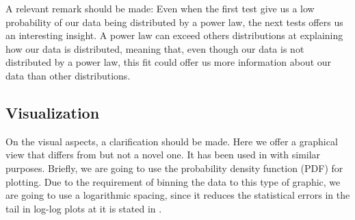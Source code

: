 \documentclass{article}
\begin{document}
A relevant remark should be made: Even when the first test give us a
low probability of our data being distributed by a power law, the next
tests offers us an interesting insight. A power law can exceed others
distributions at explaining how our data is distributed, meaning that,
even though our data is not distributed by a power law, this fit could
offer us more information about our data than other distributions.

\subsection{Visualization}
 
On the visual aspects, a clarification should be made. Here we offer a
graphical view that differs from \cite{merelo2017self} but not a novel
one. It has been used in \cite{arafat2009commit} with similar
purposes.  Briefly, we are going to use the probability density
function (PDF) for plotting. Due to the requirement of binning the
data to this type of graphic, we are going to use a logarithmic
spacing, since it reduces the statistical errors in the tail in
log-log plots at it is stated in \cite{newman2005power}.


\end{document}
